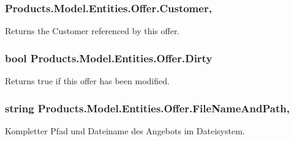 \subsubsection[{\texorpdfstring{Customer}{Customer}}]{ Products.\+Model.\+Entities.\+Offer.\+Customer\hspace{0.3cm}{\ttfamily [get]}, {\ttfamily [set]}}\hypertarget{class_products_1_1_model_1_1_entities_1_1_offer_ad12ba45d35da3a0e38b62798a885f66e}{}\label{class_products_1_1_model_1_1_entities_1_1_offer_ad12ba45d35da3a0e38b62798a885f66e}


Returns the Customer referenced by this offer. 

\subsubsection[{\texorpdfstring{Dirty}{Dirty}}]{\setlength{\rightskip}{0pt plus 5cm}bool Products.\+Model.\+Entities.\+Offer.\+Dirty\hspace{0.3cm}{\ttfamily [get]}}\hypertarget{class_products_1_1_model_1_1_entities_1_1_offer_ae3cc0fa3b3df9aa2dca2168b2e3ac088}{}\label{class_products_1_1_model_1_1_entities_1_1_offer_ae3cc0fa3b3df9aa2dca2168b2e3ac088}


Returns true if this offer has been modified. 

\subsubsection[{\texorpdfstring{File\+Name\+And\+Path}{FileNameAndPath}}]{\setlength{\rightskip}{0pt plus 5cm}string Products.\+Model.\+Entities.\+Offer.\+File\+Name\+And\+Path\hspace{0.3cm}{\ttfamily [get]}, {\ttfamily [set]}}\hypertarget{class_products_1_1_model_1_1_entities_1_1_offer_a51b9fd09135bf67afefdb1acfa60d430}{}\label{class_products_1_1_model_1_1_entities_1_1_offer_a51b9fd09135bf67afefdb1acfa60d430}


Kompletter Pfad und Dateiname des Angebots im Dateisystem. 

